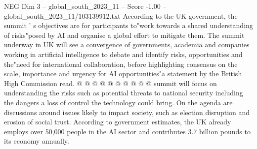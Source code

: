 \begin{textsample}{NEG Dim 3 – global\_south\_2023\_11 – Score -1.00 – global\_south\_2023\_11/103139912.txt}
According to the UK government, the summit ' s objectives are for participants to"work towards a shared understanding of risks"posed by AI and organise a global effort to mitigate them.
The summit underway in UK will see a convergence of governments, academia and companies working in artificial intelligence to debate and identify risks, opportunities and the"need for international collaboration, before highlighting consensus on the scale, importance and urgency for AI opportunities"a statement by the British High Commission read. @ @ @ @ @ @ @ @ @ @ summit will focus on understanding the risks such as potential threats to national security including the dangers a loss of control the technology could bring.
On the agenda are discussions around issues likely to impact society, such as election disruption and erosion of social trust.
According to government estimates, the UK already employs over 50,000 people in the AI sector and contributes 3.7 billion pounds to its economy annually.

\end{textsample}
